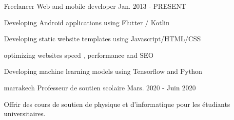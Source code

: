 

\begin{cventries}
	\cventry
	{Freelancer} %
  { Web and mobile developer} %
  {} %
  {Jan. 2013 - PRESENT} %
  {
	\begin{cvitems} %
	  \item {Developing Android  applications using Flutter / Kotlin}
	  \item {Developing static website templates using Javascript/HTML/CSS}
	  \item {optimizing websites speed , performance and SEO}
	  \item {Developing machine learning models using Tensorflow and Python}
	  \end{cvitems}
  }

  \cventry
      {marrakech} %
    { Professeur de soutien scolaire} %
    {} %
    {Mars. 2020 - Juin 2020} %
    {
      \begin{cvitems} %
            \item {Offrir des cours  de soutien de physique et d'informatique pour les étudiants universitaires.
    }
        \end{cvitems}
    }



 

 

 
 

\end{cventries}
